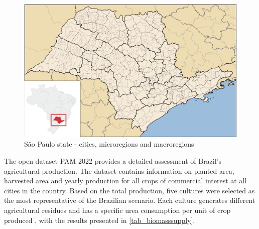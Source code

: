 \documentclass[a4paper, titlepage]{article}
\begin{document}
\begin{figure}[htb]
    \includegraphics[width=\textwidth]{img/saopaulo_microregions.png}
    \caption{São Paulo state - cities, microregions and macroregions}
    \label{img_microregions}
\end{figure}

The open dataset PAM 2022 \cite{IBGEPAMProducao2022} provides a detailed assessment of Brazil's agricultural production.
The dataset contains information on planted area, harvested area and yearly production for all crops of commercial
interest at all cities in the country. Based on the total production, five cultures were selected as the most
representative of the Brazilian scenario. Each culture generates different agricultural residues
\cite{souzaTheoreticalTechnicalAssessment2021} and has a specific urea consumption per unit of crop produced
\cite{IFASTATFertilizerUse2024}, with the results presented in \autoref{tab_biomasssupply}.
\end{document}
